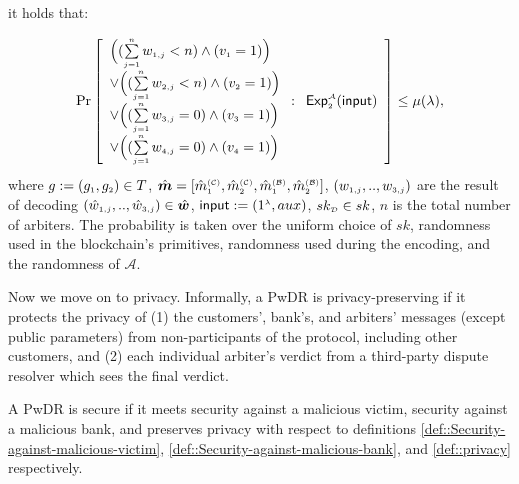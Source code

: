 \begin{definition}
it holds that:

$$ \Pr\left[
  \begin{array}{l}
  
 
\Big( (\sum\limits_{\st j=1}^{\st n}w_{\st 1,j}< {n}) \wedge ( v_{\st 1}=1)\Big) \\
 
 \vee \Big(( \sum\limits_{\st j=1}^{\st n}w_{\st 2,j}< {n}) \wedge ( v_{\st 2}=1)\Big) \\
 \vee  \Big(( \sum\limits_{\st j=1}^{\st n}w_{\st 3,j}= 0) \wedge ( v_{\st 3}=1)\Big) \\
  \vee  \Big(( \sum\limits_{\st j=1}^{\st n}w_{\st 4,j}=0) \wedge ( v_{\st 4}=1)\Big) \\
\end{array} :
    \begin{array}{l}
    \mathsf{Exp}_{\st 2}^{\st\mathcal{A}}(\mathsf{input})\\
\end{array}    \right]\leq \mu(\lambda),$$
where $g:=(g_{\st 1}, g_{\st 2})\in T$, $\hat {\bm m}=[\hat {m}^{\st (\mathcal{C})}_{\st 1}, \hat {m}^{\st (\mathcal{C})}_{\st 2}, \hat {m}^{\st (\mathcal{B})}_{\st 1}, \hat {m}^{\st (\mathcal{B})}_{\st 2}]$, $(w_{\st 1,j},..,w_{\st 3,j})$ are the result of decoding   $(\hat w_{\st 1,j},..,\hat w_{\st 3,j})\in \hat {\bm w}$, $\mathsf{input}:=(1^{\st\lambda},  {aux})$, $ sk_{\st \mathcal{D}}\in sk$, $n$ is the total number of arbiters. The probability is taken over the uniform choice of $sk$, randomness used in the blockchain's primitives, randomness used during the encoding, and  the randomness of $\mathcal{A}$. 
\end{definition}


Now we move on to privacy. Informally, a PwDR is privacy-preserving if it protects the privacy of (1) the customers', bank's, and arbiters' messages (except public parameters) from  non-participants of the protocol, including other customers, and (2) each individual arbiter's verdict from a third-party dispute resolver which sees the final verdict. 







\begin{definition}[Security]\label{def::PwDR-security}
A PwDR is secure if it meets security against a malicious victim,  security against a malicious bank, and preserves privacy with respect to definitions \ref{def::Security-against-malicious-victim}, \ref{def::Security-against-malicious-bank}, and \ref{def::privacy} respectively. 
\end{definition}


